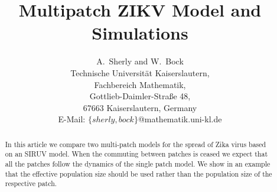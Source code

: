 \documentclass{article}
\begin{document}
	\title{Multipatch ZIKV Model and Simulations}
	
	\author{A.~Sherly and W.~Bock\\[.3cm]
		{\small Technische Universit\"at Kaiserslautern,}\\{\small  Fachbereich Mathematik,}\\ {\small Gottlieb-Daimler-Stra{\ss}e 48,}\\ {\small 67663 Kaiserslautern, Germany}\\
		{\small E-Mail: $\{sherly,bock\}$@mathematik.uni-kl.de}\\[.2cm]
		}
	
	
	
	\maketitle
	




\begin{abstract}In this article we compare two multi-patch models for the spread of Zika virus based on an SIRUV model. When the commuting between patches is ceased we expect that all the patches follow the dynamics of the single patch model. We show in an example that the effective population size should be used rather than the population size of the respective patch.
\end{abstract}
\end{document}
